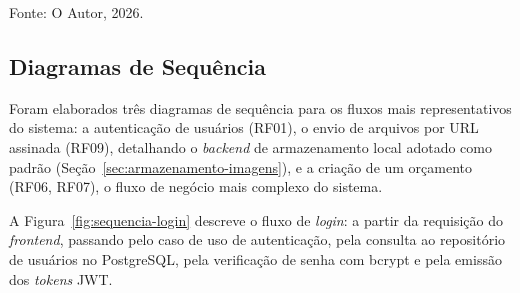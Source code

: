 \begin{figure}[H]
{
}
\end{figure}
{\centering\small Fonte: O Autor, 2026.\par}
\vspace{0.8em}



\subsection{Diagramas de Sequência}
\label{sec:diagramas-sequencia}

Foram elaborados três diagramas de sequência para os fluxos mais representativos do sistema: a autenticação de usuários (RF01), o envio de arquivos por URL assinada (RF09), detalhando o \textit{backend} de armazenamento local adotado como padrão (Seção~\ref{sec:armazenamento-imagens}), e a criação de um orçamento (RF06, RF07), o fluxo de negócio mais complexo do sistema.

A Figura~\ref{fig:sequencia-login} descreve o fluxo de \textit{login}: a partir da requisição do \textit{frontend}, passando pelo caso de uso de autenticação, pela consulta ao repositório de usuários no PostgreSQL, pela verificação de senha com bcrypt e pela emissão dos \textit{tokens} JWT.

